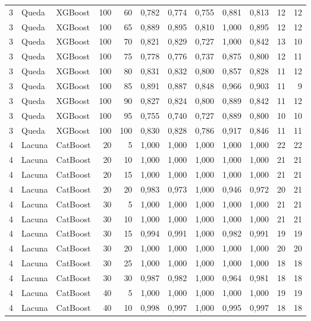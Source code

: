 \begin{longtable}{@{}rllrrrrrrrrr@{}}
3 & Queda & XGBoost & 100 & 60 & 0,782 & 0,774 & 0,755 & 0,881 & 0,813 & 12 & 12 \\
3 & Queda & XGBoost & 100 & 65 & 0,889 & 0,895 & 0,810 & 1,000 & 0,895 & 12 & 12 \\
3 & Queda & XGBoost & 100 & 70 & 0,821 & 0,829 & 0,727 & 1,000 & 0,842 & 13 & 10 \\
3 & Queda & XGBoost & 100 & 75 & 0,778 & 0,776 & 0,737 & 0,875 & 0,800 & 12 & 11 \\
3 & Queda & XGBoost & 100 & 80 & 0,831 & 0,832 & 0,800 & 0,857 & 0,828 & 11 & 12 \\
3 & Queda & XGBoost & 100 & 85 & 0,891 & 0,887 & 0,848 & 0,966 & 0,903 & 11 & 9 \\
3 & Queda & XGBoost & 100 & 90 & 0,827 & 0,824 & 0,800 & 0,889 & 0,842 & 11 & 12 \\
3 & Queda & XGBoost & 100 & 95 & 0,755 & 0,740 & 0,727 & 0,889 & 0,800 & 10 & 10 \\
3 & Queda & XGBoost & 100 & 100 & 0,830 & 0,828 & 0,786 & 0,917 & 0,846 & 11 & 11 \\
4 & Lacuna & CatBoost & 20 & 5 & 1,000 & 1,000 & 1,000 & 1,000 & 1,000 & 22 & 22 \\
4 & Lacuna & CatBoost & 20 & 10 & 1,000 & 1,000 & 1,000 & 1,000 & 1,000 & 21 & 21 \\
4 & Lacuna & CatBoost & 20 & 15 & 1,000 & 1,000 & 1,000 & 1,000 & 1,000 & 21 & 21 \\
4 & Lacuna & CatBoost & 20 & 20 & 0,983 & 0,973 & 1,000 & 0,946 & 0,972 & 20 & 21 \\
4 & Lacuna & CatBoost & 30 & 5 & 1,000 & 1,000 & 1,000 & 1,000 & 1,000 & 21 & 21 \\
4 & Lacuna & CatBoost & 30 & 10 & 1,000 & 1,000 & 1,000 & 1,000 & 1,000 & 21 & 21 \\
4 & Lacuna & CatBoost & 30 & 15 & 0,994 & 0,991 & 1,000 & 0,982 & 0,991 & 19 & 19 \\
4 & Lacuna & CatBoost & 30 & 20 & 1,000 & 1,000 & 1,000 & 1,000 & 1,000 & 20 & 20 \\
4 & Lacuna & CatBoost & 30 & 25 & 1,000 & 1,000 & 1,000 & 1,000 & 1,000 & 18 & 18 \\
4 & Lacuna & CatBoost & 30 & 30 & 0,987 & 0,982 & 1,000 & 0,964 & 0,981 & 18 & 18 \\
4 & Lacuna & CatBoost & 40 & 5 & 1,000 & 1,000 & 1,000 & 1,000 & 1,000 & 19 & 19 \\
4 & Lacuna & CatBoost & 40 & 10 & 0,998 & 0,997 & 1,000 & 0,995 & 0,997 & 18 & 18 \\

\end{longtable}
